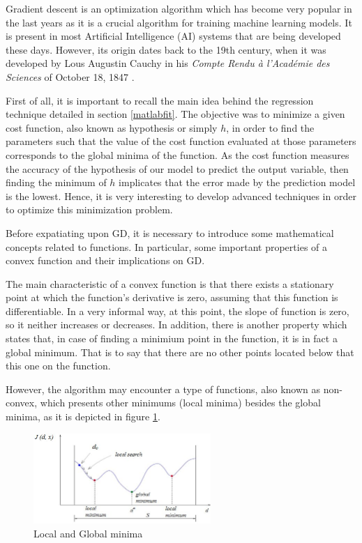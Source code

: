 \documentclass[a4paper, report, oneside, UKenglish]{memoir}
\begin{document}
Gradient descent is an optimization algorithm which has become very popular in the last years as it is a crucial algorithm for training machine learning models. It is present in most Artificial Intelligence (AI) systems that are being developed these days. However, its origin dates back to the 19th century, when it was developed by Lous Augustin Cauchy in his \textit{Compte Rendu à l’Académie des Sciences} of October 18, 1847 \cite{cauchy}.

First of all, it is important to recall the main idea behind the regression technique detailed in section \ref{matlabfit}. The objective was to minimize a given cost function, also known as hypothesis or simply $h$, in order to find the parameters such that the value of the cost function evaluated at those parameters corresponds to the global minima of the function. As the cost function measures the accuracy of the hypothesis of our model to predict the output variable, then finding the minimum of $h$ implicates that the error made by the prediction model is the lowest. Hence, it is very interesting to develop advanced techniques in order to optimize this minimization problem. 

Before expatiating upon GD, it is necessary to introduce some mathematical concepts related to functions. In particular, some important properties of a convex function and their implications on GD. 

The main characteristic of a convex function is that there exists a stationary point at which the function's derivative is zero, assuming that this function is differentiable. In a very informal way, at this point, the slope of function is zero, so it neither increases or decreases. In addition, there is another property which states that, in case of finding a minimium point in the function, it is in fact a global minimum. That is to say that there are no other points located below that this one on the function. 

However, the algorithm may encounter a type of functions, also known as non-convex, which presents other minimums (local minima) besides the global minima, as it is depicted in figure \ref{fig:Minimas}.

\begin{figure}[hbt]
    \centering
    \includegraphics[width=0.6\textwidth]{fitting/Local-and-Global-minima_W640.jpg}
    \caption{Local and Global minima}
    \label{fig:Minimas}
\end{figure}
\end{document}
